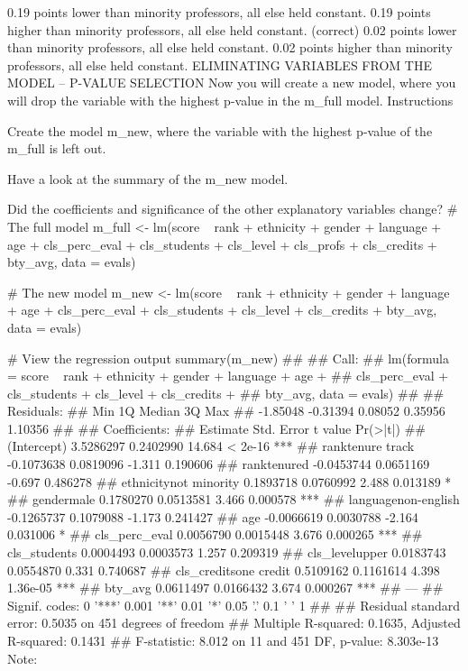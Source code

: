 0.19 points lower than minority professors, all else held constant.
0.19 points higher than minority professors, all else held constant. (correct)
0.02 points lower than minority professors, all else held constant.
0.02 points higher than minority professors, all else held constant.
ELIMINATING VARIABLES FROM THE MODEL – P-VALUE SELECTION
Now you will create a new model, where you will drop the variable with the highest
p-value in the m_full model.
Instructions

Create the model m_new, where the variable with the highest p-value of the m_full
is left out.

Have a look at the summary of the m_new model. 

Did the coefficients and significance of the other explanatory variables change?
# The full model
m_full <- lm(score ~ rank + ethnicity + gender + language + age + cls_perc_eval + cls_students + cls_level + cls_profs + cls_credits + bty_avg, data = evals)

# The new model
m_new <- lm(score ~ rank + ethnicity + gender + language + age + cls_perc_eval + cls_students + cls_level + cls_credits + bty_avg, data = evals)

# View the regression output
summary(m_new)
## 
## Call:
## lm(formula = score ~ rank + ethnicity + gender + language + age + 
##     cls_perc_eval + cls_students + cls_level + cls_credits + 
##     bty_avg, data = evals)
## 
## Residuals:
##      Min       1Q   Median       3Q      Max 
## -1.85048 -0.31394  0.08052  0.35956  1.10356 
## 
## Coefficients:
##                         Estimate Std. Error t value Pr(>|t|)    
## (Intercept)            3.5286297  0.2402990  14.684  < 2e-16 ***
## ranktenure track      -0.1073638  0.0819096  -1.311 0.190606    
## ranktenured           -0.0453744  0.0651169  -0.697 0.486278    
## ethnicitynot minority  0.1893718  0.0760992   2.488 0.013189 *  
## gendermale             0.1780270  0.0513581   3.466 0.000578 ***
## languagenon-english   -0.1265737  0.1079088  -1.173 0.241427    
## age                   -0.0066619  0.0030788  -2.164 0.031006 *  
## cls_perc_eval          0.0056790  0.0015448   3.676 0.000265 ***
## cls_students           0.0004493  0.0003573   1.257 0.209319    
## cls_levelupper         0.0183743  0.0554870   0.331 0.740687    
## cls_creditsone credit  0.5109162  0.1161614   4.398 1.36e-05 ***
## bty_avg                0.0611497  0.0166432   3.674 0.000267 ***
## ---
## Signif. codes:  0 '***' 0.001 '**' 0.01 '*' 0.05 '.' 0.1 ' ' 1
## 
## Residual standard error: 0.5035 on 451 degrees of freedom
## Multiple R-squared:  0.1635, Adjusted R-squared:  0.1431 
## F-statistic: 8.012 on 11 and 451 DF,  p-value: 8.303e-13
Note:

